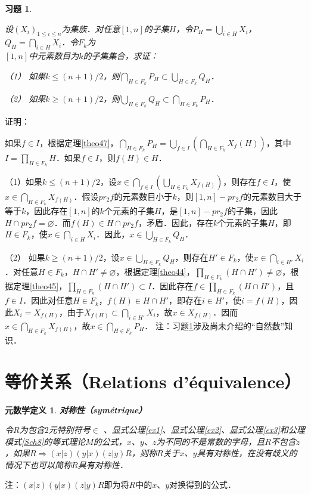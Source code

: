 \documentclass[12pt, a4paper, oneside]{book}
\newtheorem{metadef}{元数学定义}
\newtheorem{exer}{习题}
\begin{document}
			\begin{exer}\label{exer66}
				\hfill\par
				设$(X_i)_{1\leq i\leq n}$为集族．对任意$[1, n]$的子集$H$，令$P_H=\bigcup\limits_{i\in H}X_i$，$Q_H=\bigcap\limits_{i\in H}X_i$．令$F_k$为\\$[1, n]$中元素数目为$k$的子集集合，求证：
				\par
				（1）	如果$k\leq (n+1)/2$，则$\bigcap\limits_{H\in F_k}P_H\subset \bigcup\limits_{H\in F_k}Q_H$．
				\par
				（2）	如果$k\geq (n+1)/2$，则$\bigcup\limits_{H\in F_k}Q_H\subset \bigcap\limits_{H\in F_k}P_H$．
			\end{exer}
			证明：
			\par
			如果$f\in I$，根据定理\ref{theo47}，$\bigcap\limits_{H\in F_k}P_H=\bigcup\limits_{f\in I}(\bigcap\limits_{H\in F_k}X_f(H))$，其中$I=\prod\limits_{H\in F_k}H$．如果$f\in I$，则$f(H)\in H$．
			\par
			（1）如果$k\leq (n+1)/2$，设$x\in \bigcap\limits_{f\in I}(\bigcup\limits_{H\in F_k}X_{f(H)})$，则存在$f\in I$，使$x\in \bigcap\limits_{H\in F_k}X_{f(H)}$．假设$pr_2f$的元素数目小于$k$，则$[1, n]-pr_2f$的元素数目大于等于$k$，因此存在$[1, n]$的$k$个元素的子集$H$，是$[1, n]-pr_2f$的子集，因此$H\cap pr_2f=\varnothing$．而$f(H)\in H\cap pr_2f$，矛盾．因此，存在$k$个元素的子集$H$，即$H\in F_k$，使$x\in \bigcap\limits_{i\in H}X_i$．因此，$x\in \bigcup\limits_{H\in F_k}Q_H$．
			\par
			（2）	如果$k\geq (n+1)/2$，设$x\in \bigcup\limits_{H\in F_k}Q_H$，则存在$H'\in F_k$，使$x\in \bigcap\limits_{i\in H'}X_i$．对任意$H\in F_k$，$H\cap H'\neq \varnothing$，根据定理\ref{theo44}，$\prod\limits_{H\in F_k}(H\cap H')\neq \varnothing$，根据定理\ref{theo45}，$\prod\limits_{H\in F_k}(H\cap H')\subset I$．因此存在$f\in \prod\limits_{H\in F_k}(H\cap H')$，且$f\in I$．因此对任意$H\in F_k$，$f(H)\in H\cap H'$，即存在$i\in H'$，使$i=f(H)$，因此$X_i=X_{f(H)}$，由于$X_{f(H)}\subset \bigcap\limits_{i\in H'}X_i$，故$x\in X_{f(H)}$．因而$x\in \bigcap\limits_{H\in F_k}X_{f(H)}$，故$x\in \bigcap\limits_{H\in F_k}P_H$．
			注：习题\ref{exer66}涉及尚未介绍的“自然数”知识．
		
		\section{等价关系（Relations d'équivalence）}		
			\begin{metadef}
				\textbf{对称性（symétrique）}
				\par
				令$R$为包含$2$元特别符号$\in$ 、显式公理\ref{ex1}、显式公理\ref{ex2}、显式公理\ref{ex3}和公理模式\ref{Sch8}的等式理论$M$的公式，$x$、$y$、$z$为不同的不是常数的字母，且$R$不包含$z$，如果$R\Rightarrow (x|z)(y|x)(z|y)R$，则称$R$关于$x$、$y$具有对称性，在没有歧义的情况下也可以简称$R$具有对称性．
			\end{metadef}
			注：$(x|z)(y|x)(z|y)R$即为将$R$中的$x$、$y$对换得到的公式．
\end{document}
